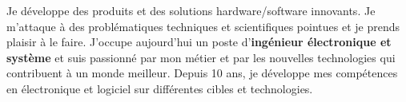 \par{
 Je développe des produits et des solutions hardware/software innovants. Je m'attaque à des problématiques techniques et scientifiques pointues et je prends plaisir à le faire. J'occupe aujourd'hui un poste d'\textbf{ingénieur électronique et système} et suis passionné par mon métier et par les nouvelles technologies qui contribuent à un monde meilleur. Depuis 10 ans, je développe mes compétences en électronique et logiciel sur différentes cibles et technologies.
}
